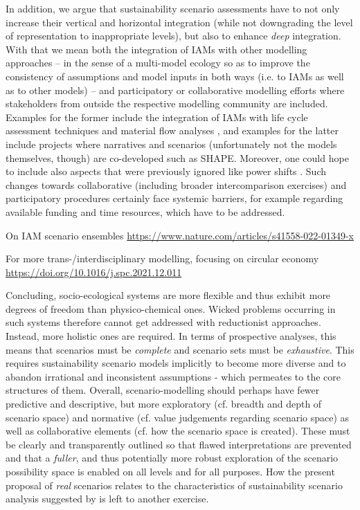 \documentclass{article}
\begin{document}
\begin{refsection}
In addition, we argue that sustainability scenario assessments have to not only increase their vertical and horizontal integration (while not downgrading the level of representation to inappropriate levels), but also to enhance \textit{deep} integration. With that we mean both the integration of IAMs with other modelling approaches -- in the sense of a multi-model ecology \parencite{bollinger_2015} so as to improve the consistency of assumptions and model inputs in both ways (i.e. to IAMs as well as to other models) -- and participatory or collaborative modelling efforts where stakeholders from outside the respective modelling community are included. Examples for the former include the integration of IAMs with life cycle assessment techniques \parencite[e.g.][]{luderer_2019} and material flow analyses \parencite[for an overview see:][]{baars_2022,kullmann_2021}, and examples for the latter include projects where narratives and scenarios (unfortunately not the models themselves, though) are co-developed such as SHAPE. Moreover, one could hope to include also aspects that were previously ignored like power shifts \parencite{rutting_2022}. Such changes towards collaborative (including broader intercomparison exercises) and participatory procedures certainly face systemic barriers, for example regarding available funding and time resources, which have to be addressed.

On IAM scenario ensembles \url{https://www.nature.com/articles/s41558-022-01349-x}

For more trans-/interdisciplinary modelling, focusing on circular economy \url{https://doi.org/10.1016/j.spc.2021.12.011}

Concluding, socio-ecological systems are more flexible and thus exhibit more degrees of freedom than physico-chemical ones. Wicked problems occurring in such systems therefore cannot get addressed with reductionist approaches. Instead, more holistic ones are required. In terms of prospective analyses, this means that scenarios must be \textit{complete} and scenario sets must be \textit{exhaustive}. This requires sustainability scenario models implicitly to become more diverse and to abandon irrational and inconsistent assumptions - which permeates to the core structures of them. Overall, scenario-modelling should perhaps have fewer predictive and descriptive, but more exploratory (cf. breadth and depth of scenario space) and normative (cf. value judgements regarding scenario space) as well as collaborative elements (cf. how the scenario space is created). These must be clearly and transparently outlined so that flawed interpretations are prevented and that a \textit{fuller}, and thus potentially more robust exploration of the scenario possibility space is enabled on all levels and for all purposes. How the present proposal of \textit{real} scenarios relates to the characteristics of sustainability scenario analysis suggested by \textcite{swart_2004} is left to another exercise.


\end{refsection}
\end{document}
